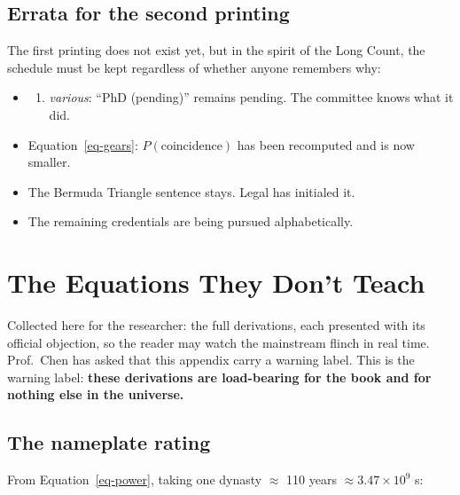 \documentclass[
  english,
  11pt,
  letterpaper,
]{scrbook}
\providecommand{\tightlist}{%
  \setlength{\itemsep}{0pt}\setlength{\parskip}{0pt}}
\begin{document}
\section*{Errata for the second
printing}\label{errata-for-the-second-printing}


The first printing does not exist yet, but in the spirit of the Long
Count, the schedule must be kept regardless of whether anyone remembers
why:

\begin{itemize}
\tightlist
\item
  \begin{enumerate}
  \def\labelenumi{\alph{enumi}.}
  \setcounter{enumi}{15}
  \tightlist
  \item
    \emph{various}: ``PhD (pending)'' remains pending. The committee
    knows what it did.
  \end{enumerate}
\item
  Equation~\ref{eq-gears}: \(P(\text{coincidence})\) has been recomputed
  and is now smaller.
\item
  The Bermuda Triangle sentence stays. Legal has initialed it.
\item
  The remaining credentials are being pursued alphabetically.
\end{itemize}

\cleardoublepage
{}
{}
\appendix

\chapter{The Equations They Don't Teach}\label{sec-equations}

Collected here for the researcher: the full derivations, each presented
with its official objection, so the reader may watch the mainstream
flinch in real time. Prof.~Chen has asked that this appendix carry a
warning label. This is the warning label: \textbf{these derivations are
load-bearing for the book and for nothing else in the universe.}

\section{The nameplate rating}\label{sec-nameplate}

From Equation~\ref{eq-power}, taking one dynasty \(\approx\) 110 years
\(\approx 3.47
\times 10^{9}\) s:
\end{document}
